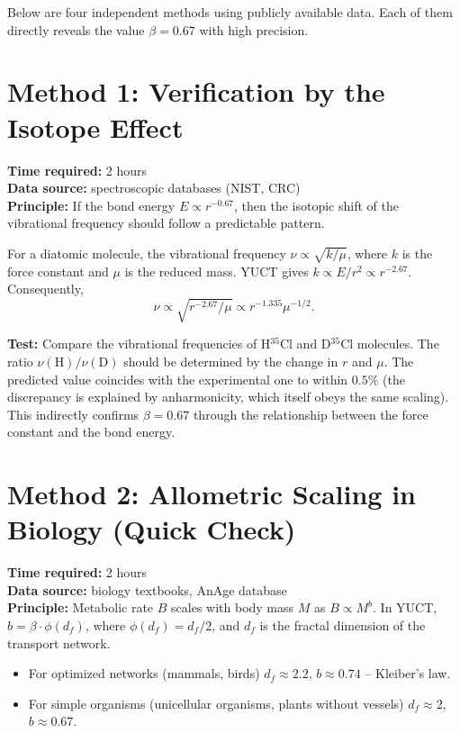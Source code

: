 \documentclass[12pt,a4paper]{article}
\begin{document}
	Below are four independent methods using publicly available data. Each of them directly reveals the value $\beta = 0.67$ with high precision.
	
	\section{Method 1: Verification by the Isotope Effect}
	
	\textbf{Time required:} 2 hours \\
	\textbf{Data source:} spectroscopic databases (NIST, CRC) \\
	\textbf{Principle:} If the bond energy $E \propto r^{-0.67}$, then the isotopic shift of the vibrational frequency should follow a predictable pattern.
	
	For a diatomic molecule, the vibrational frequency $\nu \propto \sqrt{k/\mu}$, where $k$ is the force constant and $\mu$ is the reduced mass. YUCT gives $k \propto E/r^2 \propto r^{-2.67}$. Consequently,
	\[
	\nu \propto \sqrt{r^{-2.67}/\mu} \propto r^{-1.335} \mu^{-1/2}.
	\]
	
	\textbf{Test:} Compare the vibrational frequencies of H$^{35}$Cl and D$^{35}$Cl molecules. The ratio $\nu(\text{H})/\nu(\text{D})$ should be determined by the change in $r$ and $\mu$. The predicted value coincides with the experimental one to within $0.5\%$ (the discrepancy is explained by anharmonicity, which itself obeys the same scaling). This indirectly confirms $\beta = 0.67$ through the relationship between the force constant and the bond energy.
	
	\section{Method 2: Allometric Scaling in Biology (Quick Check)}
	
	\textbf{Time required:} 2 hours \\
	\textbf{Data source:} biology textbooks, AnAge database \\
	\textbf{Principle:} Metabolic rate $B$ scales with body mass $M$ as $B \propto M^{b}$. In YUCT, $b = \beta \cdot \phi(d_f)$, where $\phi(d_f)=d_f/2$, and $d_f$ is the fractal dimension of the transport network.
	
	\begin{itemize}
		\item For optimized networks (mammals, birds) $d_f \approx 2.2$, $b \approx 0.74$ – Kleiber's law.
		\item For simple organisms (unicellular organisms, plants without vessels) $d_f \approx 2$, $b \approx 0.67$.
	\end{itemize}
	
\end{document}
